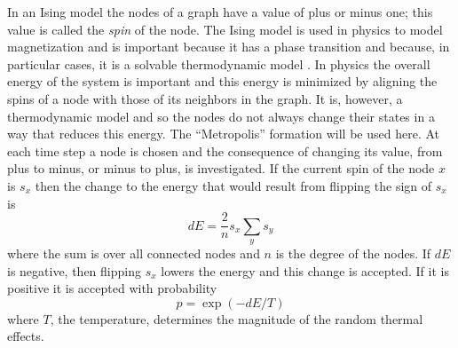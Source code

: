 \documentclass[letterpaper]{article}
\begin{document}
In an Ising model the nodes of a graph have a value of plus or minus one; this value is called the \textsl{spin} of the node. The Ising model is used in physics to model magnetization and is important because it has a phase transition and because, in particular cases, it is a solvable thermodynamic model \citep{Onsager1944}. In physics the overall energy of the system is important and this energy is minimized by aligning the spins of a node with those of its neighbors in the graph.
It is, however, a thermodynamic model and so the nodes do not always change their states in a way that reduces this energy. The ``Metropolis'' formation will be used here. At each time step a node is chosen and the consequence of changing its value, from plus to minus, or minus to plus, is investigated. If the current spin of the node $x$ is $s_x$ then the change to the energy that would result from flipping the sign of $s_x$ is
\begin{equation}
dE=\frac{2}{n}s_x\sum_y s_y
\end{equation}
where the sum is over all connected nodes and $n$ is the degree of the nodes. If $dE$ is negative, then flipping $s_x$ lowers the energy and this change is accepted. If it is positive it is accepted with probability
\begin{equation}
    p=\exp{(-dE/T)}
\end{equation}
where $T$, the temperature, determines the magnitude of the random thermal effects. 
\end{document}
